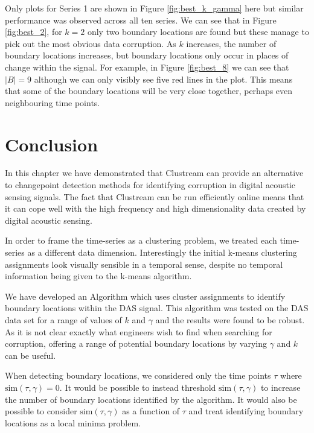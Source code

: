 Only plots for Series 1 are shown in Figure \ref{fig:best_k_gamma} here but similar performance was observed across all ten series.  We can see that in Figure \ref{fig:best_2}, for $k=2$ only two boundary locations are found but these manage to pick out the most obvious data corruption. As $k$ increases, the number of boundary locations increases, but boundary locations only occur in places of change within the signal. For example, in Figure \ref{fig:best_8} we can see that $|B| = 9$ although we can only visibly see five red lines in the plot. This means that some of the boundary locations will be very close together, perhaps even neighbouring time points. 


\section{Conclusion}
\label{sec:das_conc}

In this chapter we have demonstrated that Clustream can provide an alternative to changepoint detection methods for identifying corruption in digital acoustic sensing signals. The fact that Clustream can be run efficiently online means that it can cope well with the high frequency and high dimensionality data created by digital acoustic sensing. 

In order to frame the time-series as a clustering problem, we treated each time-series as a different data dimension. Interestingly the initial k-means clustering assignments look visually sensible in a temporal sense, despite no temporal information being given to the k-means algorithm.

We have developed an Algorithm which uses cluster assignments to identify boundary locations within the DAS signal. This algorithm was tested on the DAS data set for a range of values of $k$ and $\gamma$ and the results were found to be robust. As it is not clear exactly what engineers wish to find when searching for corruption, offering a range of potential boundary locations by varying $\gamma$ and $k$ can be useful. 

When detecting boundary locations, we considered only the time points $\tau$ where $\text{sim}(\tau, \gamma)=0$. It would be possible to instead threshold $\text{sim}(\tau, \gamma)$  to increase the number of boundary locations identified by the algorithm. It would  also be possible to consider  $\text{sim}(\tau, \gamma)$ as a function of $\tau$ and treat identifying boundary locations as a local minima problem.


